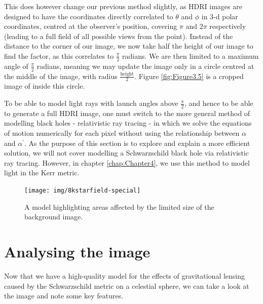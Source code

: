 \documentclass[oneside,openright,frontopenright, singlespacing]{dmathesis}
\begin{document}
\vspace{1em}
	This does however change our previous method slightly, as HDRI images are designed to have the coordinates directly correlated to $\theta$ and $\phi$ in 3-d polar coordinates, centred at the observer's position, covering $\pi$ and $2\pi$ respectively (leading to a full field of all possible views from the point). Instead of the distance to the corner of our image, we now take half the height of our image to find the factor, as this correlates to $\frac{\pi}{2}$ radians. We are then limited to a maximum angle of $\frac{\pi}{2}$ radians, meaning we may update the image only in a circle centred at the middle of the image, with radius $\frac{\mbox{height}}{2}$. Figure \ref{fig:Figure3.5} is a cropped image of inside this circle.

\vspace{1em}
	To be able to model light rays with launch angles above $\frac{\pi}{2}$, and hence to be able to generate a full HDRI image, one must switch to the more general method of modelling black holes - relativistic ray tracing - in which we solve the equations of motion numerically for each pixel without using the relationship between $\alpha$ and $\alpha^'$. As the purpose of this section is to explore and explain a more efficient solution, we will not cover modelling a Schwarzschild black hole via relativistic ray tracing. However, in chapter \ref{chap:Chapter4}, we use this method to model light in the Kerr metric.

\begin{figure}[!ht]
	\centering
	\texttt{[image: img/8kstarfield-special]}
	\caption{A model highlighting areas affected by the limited size of the background image.}
	\label{fig:Figure3.4}
\end{figure}

\section{Analysing the image}\label{sec:Section3.6}

	Now that we have a high-quality model for the effects of gravitational lensing caused by the Schwarzschild metric on a celestial sphere, we can take a look at the image and note some key features.
\end{document}
